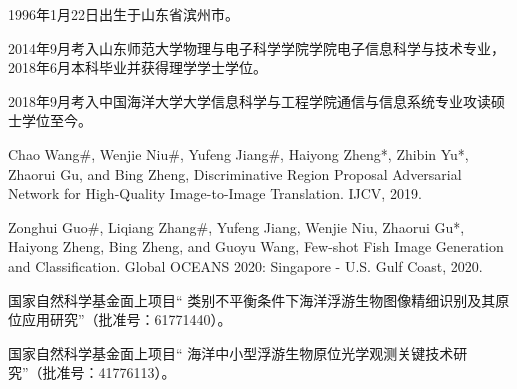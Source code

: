 \begin{resume}


  1996年1月22日出生于山东省滨州市。

  2014年9月考入山东师范大学物理与电子科学学院学院电子信息科学与技术专业，2018年6月本科毕业并获得理学学士学位。
  
  2018年9月考入中国海洋大学大学信息科学与工程学院通信与信息系统专业攻读硕士学位至今。


  \begin{publications}
    \item Chao Wang$\#$, Wenjie Niu$\#$, Yufeng Jiang$\#$, Haiyong Zheng*, Zhibin Yu*, Zhaorui Gu, and Bing Zheng, Discriminative Region Proposal Adversarial Network for High-Quality Image-to-Image Translation. IJCV, 2019.
    \item Zonghui Guo$\#$, Liqiang Zhang$\#$, Yufeng Jiang, Wenjie Niu, Zhaorui Gu*, Haiyong Zheng, Bing Zheng, and Guoyu Wang, Few-shot Fish Image Generation and Classification. Global OCEANS 2020: Singapore - U.S. Gulf Coast, 2020.
  \end{publications}

  \begin{achievements}
    \item 国家自然科学基金面上项目“ 类别不平衡条件下海洋浮游生物图像精细识别及其原位应用研究”（批准号：61771440）。
    \item 国家自然科学基金面上项目“ 海洋中小型浮游生物原位光学观测关键技术研究”（批准号：41776113）。

  \end{achievements}

\end{resume}

